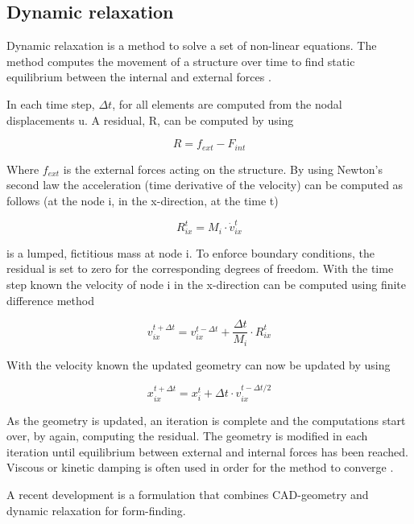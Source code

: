 \subsection{Dynamic relaxation}
\label{sec:dr}
Dynamic relaxation is a method to solve a set of non-linear equations. The method computes the movement of a structure over time to find static equilibrium between the internal and external forces \cite{Day1965, barnes1988form}. 

In each time step,  $\Delta t$, for all elements are computed from the nodal displacements u. A residual, R, can be computed by using 

\begin{equation*}
  R = f_{ext} - F_{int} 
\end{equation*}

Where $f_{ext}$ is the external forces acting on the structure. By using Newton’s second law the acceleration (time derivative of the velocity) can be computed as follows (at the node i, in the x-direction, at the time t)

\begin{equation*}
  R^t_{ix} = M_i  \cdot \dot{v}^t_{ix}
\end{equation*}

 is a lumped, fictitious mass at node i. To enforce boundary conditions, the residual is set to zero for the corresponding degrees of freedom. With the time step known the velocity of node i in the x-direction can be computed using finite difference method

\begin{equation*}
  v^{t+\Delta t}_{ix} = v^{t-\Delta t}_{ix} + \frac{\Delta t}{M_i} \cdot R^t_{ix}
\end{equation*}

With the velocity known the updated geometry can now be updated by using

\begin{equation*}
  x^{t+\Delta t}_{ix} = x^t_i + \Delta t \cdot v_{ix}^{t-\Delta t / 2}
\end{equation*}

As the geometry is updated, an iteration is complete and the computations start over, by again, computing the residual. The geometry is modified in each iteration until equilibrium between external and internal forces has been reached. Viscous or kinetic damping is often used in order for the method to converge \cite{barnes1988form}.

A recent development is a formulation that combines CAD-geometry and dynamic relaxation \cite{Alic2015} for form-finding.

